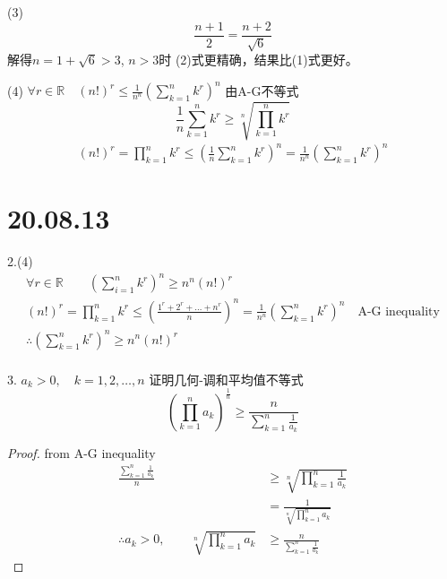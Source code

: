 \documentclass[10pt,a4paper]{book}
\begin{document}
	(3) 
	\begin{equation*}
		\frac{n+1}{2} = \frac{n+2}{\sqrt{6}}
	\end{equation*}
	解得$ n=1+\sqrt{6} >3 $, 
	$ n>3 $时 (2)式更精确，结果比(1)式更好。
	
	(4) $ \forall r \in \mathbb{R} \quad (n!)^r \le \frac{1}{n^n}(\sum_{k=1}^n k^r)^n$
	由A-G不等式
	\begin{equation*}
		\frac{1}{n}\sum_{k=1}^n k^r \ge \sqrt[n]{\prod_{k=1}^n k^r}
	\end{equation*}
	\begin{equation*}
		\begin{aligned}
			(n!)^r  = \prod_{k=1}^n k^r\le (\frac{1}{n}\sum_{k=1}^n k^r)^n =\frac{1}{n^n}(\sum_{k=1}^n k^r)^n
		\end{aligned}
	\end{equation*}
	
	\section{20.08.13}
	2.(4) 
	\begin{equation}
		\begin{aligned}
			\forall r \in \mathbb{R} \qquad (\sum_{i=1}^n k^r)^n \ge n^n(n!)^r \\
			 (n!)^r = \prod_{k=1}^n k^r \le (\frac{1^r+2^r+\dots + n^r}{n})^n = \frac{1}{n^n}(\sum_{k=1}^n k^r)^n \quad \text{A-G inequality} \\
			 \therefore (\sum_{k=1}^n k^r)^n \ge n^n(n!)^r\\
		\end{aligned}
	\end{equation}
	
	3. $ a_k >0, \quad k=1,2,\dots, n $ 证明几何-调和平均值不等式
	\begin{equation}
		(\prod_{k=1}^n a_k)^{\frac{1}{n}}\ge \frac{n}{\sum_{k=1}^n\frac{1}{a_k}}
	\end{equation}	
	\begin{proof}
		from A-G inequality 
		\begin{equation}
			\begin{aligned}
				\frac{\sum_{k=1}^n\frac{1}{a_k}}{n} &\ge \sqrt[n]{\prod_{k=1}^n \frac{1}{a_k}} \\
				& =  \frac{1}{\sqrt[n]{\prod_{k=1}^n{a_k}}}\\
				\therefore a_k>0, \qquad {\sqrt[n]{\prod_{k=1}^n{a_k}}}&\ge \frac{n}{\sum_{k=1}^n\frac{1}{a_k}}
			\end{aligned}
		\end{equation}
		
	\end{proof}
	
\end{document}
